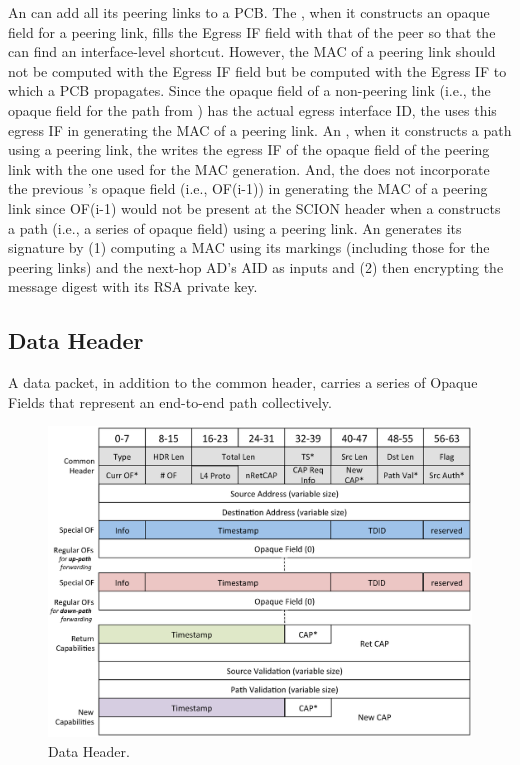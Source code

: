 An \AD can add all its peering links to a PCB. The \BS, when it constructs an opaque field for a peering link, fills the Egress IF field with that of the peer so that the \STUB \AD can find an interface-level shortcut. However, the MAC of a peering link should not be computed with the Egress IF field but be computed with the Egress IF to which a PCB propagates. Since the opaque field of a non-peering link (i.e., the opaque field for the path from \ISDC) has the actual egress interface ID, the \BS uses this egress IF in generating the MAC of a peering link. An \STUB \AD, when it constructs a path using a peering link, the \AD writes the egress IF of the opaque field of the peering link with the one used for the MAC generation. And, the \BS does not incorporate the previous \AD's opaque field (i.e., OF(i-1)) in generating the MAC of a peering link since OF(i-1) would not be present at the SCION header when a \STUB \AD constructs a path (i.e., a series of opaque field) using a peering link. An \AD generates its signature by (1) computing a MAC using its markings (including those for the peering links) and the next-hop AD's AID as inputs and (2) then encrypting the message digest with its RSA private key.

\subsection{Data Header}\label{subsec:data-header}
A data packet, in addition to the common header, carries a series of Opaque Fields that represent an end-to-end path collectively.

\begin{figure}[ht]
\centering
\includegraphics[width=.9\columnwidth]{./fig/nhdr_data.eps}
\caption{Data Header.}\label{fig:hdr-data}
\end{figure}

